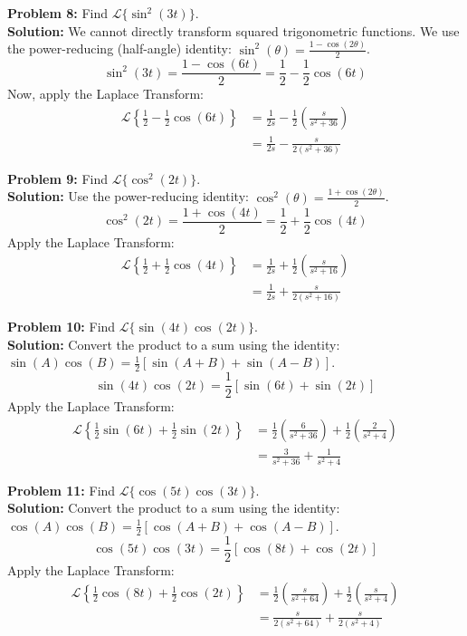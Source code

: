 \documentclass[11pt, letterpaper]{article}
\theoremstyle{definition}
\theoremstyle{remark}
\begin{document}
\vspace{1em}
\textbf{Problem 8:} Find $\mathscr{L}\{\sin^2(3t)\}$.
\vspace{0.5em} \\
\textbf{Solution:} We cannot directly transform squared trigonometric functions. We use the power-reducing (half-angle) identity: $\sin^2(\theta) = \frac{1 - \cos(2\theta)}{2}$.
\[
\sin^2(3t) = \frac{1 - \cos(6t)}{2} = \frac{1}{2} - \frac{1}{2}\cos(6t)
\]
Now, apply the Laplace Transform:
\begin{align*}
    \mathscr{L}\left\{\frac{1}{2} - \frac{1}{2}\cos(6t)\right\} &= \frac{1}{2s} - \frac{1}{2}\left(\frac{s}{s^2 + 36}\right) \\[4pt]
    &= \frac{1}{2s} - \frac{s}{2(s^2 + 36)}
\end{align*}

\vspace{1em}
\textbf{Problem 9:} Find $\mathscr{L}\{\cos^2(2t)\}$.
\vspace{0.5em} \\
\textbf{Solution:} Use the power-reducing identity: $\cos^2(\theta) = \frac{1 + \cos(2\theta)}{2}$.
\[
\cos^2(2t) = \frac{1 + \cos(4t)}{2} = \frac{1}{2} + \frac{1}{2}\cos(4t)
\]
Apply the Laplace Transform:
\begin{align*}
    \mathscr{L}\left\{\frac{1}{2} + \frac{1}{2}\cos(4t)\right\} &= \frac{1}{2s} + \frac{1}{2}\left(\frac{s}{s^2 + 16}\right) \\[4pt]
    &= \frac{1}{2s} + \frac{s}{2(s^2 + 16)}
\end{align*}

\vspace{1em}
\textbf{Problem 10:} Find $\mathscr{L}\{\sin(4t)\cos(2t)\}$.
\vspace{0.5em} \\
\textbf{Solution:} Convert the product to a sum using the identity: $\sin(A)\cos(B) = \frac{1}{2}[\sin(A+B) + \sin(A-B)]$.
\[
\sin(4t)\cos(2t) = \frac{1}{2}[\sin(6t) + \sin(2t)]
\]
Apply the Laplace Transform:
\begin{align*}
    \mathscr{L}\left\{\frac{1}{2}\sin(6t) + \frac{1}{2}\sin(2t)\right\} &= \frac{1}{2}\left(\frac{6}{s^2 + 36}\right) + \frac{1}{2}\left(\frac{2}{s^2 + 4}\right) \\[4pt]
    &= \frac{3}{s^2 + 36} + \frac{1}{s^2 + 4}
\end{align*}

\vspace{1em}
\textbf{Problem 11:} Find $\mathscr{L}\{\cos(5t)\cos(3t)\}$.
\vspace{0.5em} \\
\textbf{Solution:} Convert the product to a sum using the identity: $\cos(A)\cos(B) = \frac{1}{2}[\cos(A+B) + \cos(A-B)]$.
\[
\cos(5t)\cos(3t) = \frac{1}{2}[\cos(8t) + \cos(2t)]
\]
Apply the Laplace Transform:
\begin{align*}
    \mathscr{L}\left\{\frac{1}{2}\cos(8t) + \frac{1}{2}\cos(2t)\right\} &= \frac{1}{2}\left(\frac{s}{s^2 + 64}\right) + \frac{1}{2}\left(\frac{s}{s^2 + 4}\right) \\[4pt]
    &= \frac{s}{2(s^2 + 64)} + \frac{s}{2(s^2 + 4)}
\end{align*}
\end{document}
